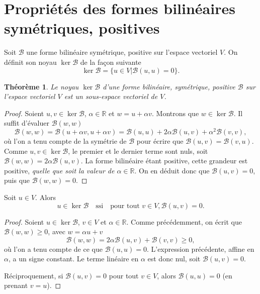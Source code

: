\documentclass[12pt, final]{amsart}
\newtheorem{theorem}{Théorème}
\newcommand{\reals}{\mathbb{R}}
\begin{document}
\appendix

\section{Propriétés des formes bilinéaires symétriques, positives}

Soit \(\mathcal B\) une forme bilinéaire symétrique, positive sur l'espace vectoriel
\(V\). On définit son noyau \(\ker\mathcal B\) de la façon suivante
\begin{equation}
  \ker\mathcal B=\{u∈ V|\mathcal B(u, u)=0\}.
\end{equation}

\begin{theorem}
  Le noyau \(\ker\mathcal B\) d'une forme bilinéaire, symétrique, positive
  \(\mathcal B\) sur l'espace vectoriel \(V\) est un sous-espace vectoriel de
  \(V\).
\end{theorem}
\begin{proof}
  Soient \(u, v∈\ker\mathcal B\), \(\alpha∈\reals\) et \(w=u+\alpha
  v\). Montrons que \(w∈\ker\mathcal B\). Il suffit d'évaluer
  \(\mathcal B(w, w)\)
  \begin{equation}
    \mathcal B(w, w)=\mathcal B(u+\alpha v, u+\alpha v)=\mathcal B(u, u)+2\alpha\mathcal B(u, v)+\alpha^2\mathcal B(v, v),
  \end{equation}
  où l'on a tenu compte de la symétrie de \(\mathcal B\) pour écrire que
  \(\mathcal B(u, v)=\mathcal B(v, u)\). Comme \(u, v∈\ker\mathcal B\), le
  premier et le dernier terme sont nuls, soit
  \(\mathcal B(w, w)=2\alpha\mathcal B(u, v)\). La forme bilinéaire étant
  positive, cette grandeur est positive, \emph{quelle que soit la valeur de
    \(\alpha∈\reals\)}. On en déduit donc que \(\mathcal B(u, v)=0\), puis
  que \(\mathcal B(w, w)=0\).
\end{proof}

Soit \(u∈ V\). Alors
\begin{equation}
  u∈\ker\mathcal B\quad\text{ssi}\quad\text{pour tout }v∈ V, \mathcal B(u, v)=0.
\end{equation}
\begin{proof}
  Soient \(u∈\ker\mathcal B\), \(v∈ V\) et \(\alpha∈\reals\). Comme
  précédemment, on écrit que \(\mathcal B(w, w)≥0\), avec \(w=\alpha u+v\)
  \begin{equation}
    \mathcal B(w, w)=2\alpha\mathcal B(u, v)+\mathcal B(v, v)≥0,
  \end{equation}
  où l'on a tenu compte de ce que \(\mathcal B(u, u)=0\). L'expression
  précédente, affine en \(\alpha\), a un signe constant. Le terme linéaire en
  \(\alpha\) est donc nul, soit \(\mathcal B(u, v)=0\).

  Réciproquement, si \(\mathcal B(u, v)=0\) pour tout \(v∈ V\), alors
  \(\mathcal B(u, u)=0\) (en prenant \(v=u\)).
\end{proof}
\end{document}
